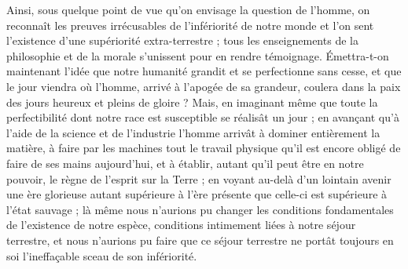 \documentclass[a4paper, 11pt, oneside]{article}
\begin{document}
Ainsi, sous quelque point de vue qu'on envisage la question de l'homme, on reconnaît les preuves irrécusables de l'infériorité de notre monde et l'on sent l'existence d'une supériorité extra-terrestre ; tous les enseignements de la philosophie et de la morale s'unissent pour en rendre témoignage. Émettra-t-on maintenant l'idée que notre humanité grandit et se perfectionne sans cesse, et que le jour viendra où l'homme, arrivé à l'apogée de sa grandeur, coulera dans la paix des jours heureux et pleins de gloire ? Mais, en imaginant même que toute la perfectibilité dont notre race est susceptible se réalisât un jour ; en avançant qu'à l'aide de la science et de l'industrie l'homme arrivât à dominer entièrement la matière, à faire par les machines tout le travail physique qu'il est encore obligé de faire de ses mains aujourd'hui, et à établir, autant qu'il peut être en notre pouvoir, le règne de l'esprit sur la Terre ; en voyant au-delà d'un lointain avenir une ère glorieuse autant supérieure à l'ère présente que celle-ci est supérieure à l'état sauvage ; là même nous n'aurions pu changer les conditions fondamentales de l'existence de notre espèce, conditions intimement liées à notre séjour terrestre, et nous n'aurions pu faire que ce séjour terrestre ne portât toujours en soi l'ineffaçable sceau de son infériorité.
\end{document}
